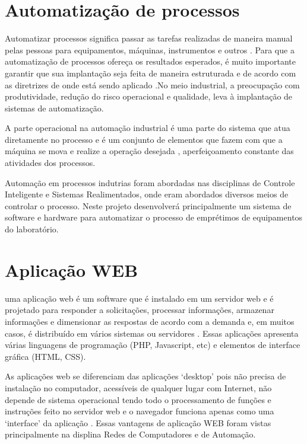\vspace{-42pt}
\section[Automatização de processos]{Automatização de processos}
Automatizar processos significa passar as tarefas realizadas de maneira manual pelas pessoas para equipamentos, máquinas, instrumentos e outros \cite{AutomatProcess}. Para que a automatização de processos ofereça os resultados esperados, é muito importante garantir que sua implantação seja feita de maneira estruturada e de acordo com as diretrizes de onde está sendo aplicado \cite{AutomatProcess2}.No meio industrial, a preocupação com produtividade, redução do risco operacional e qualidade, leva à implantação de sistemas de automatização. 

A parte operacional na automação industrial é uma parte do sistema que atua diretamente no processo e é um conjunto de elementos que fazem com que a máquina se mova e realize a operação desejada \cite{AutomatProcess3}, aperfeiçoamento constante das atividades dos processos.

Automação em processos indutrias foram abordadas nas disciplinas de Controle Inteligente e Sistemas Realimentados, onde eram abordados diversos meios de controlar o processo. Neste projeto desenvolverá principalmente um sistema de software e hardware para automatizar o processo de emprétimos de equipamentos do laboratório.

\section[Aplicação WEB]{Aplicação WEB}
uma aplicação web é um software que é instalado em um servidor web e é projetado para responder a solicitações, processar informações, armazenar informações e dimensionar as respostas de acordo com a demanda e, em muitos casos, é distribuído em vários sistemas ou servidores \cite{WEB1}. Essas aplicações apresenta várias linguagens de programação (PHP, Javascript, etc) e elementos de interface gráfica (HTML, CSS).

As aplicações web se diferenciam das aplicações ‘desktop’ pois não precisa de instalação no computador, acessíveis de qualquer lugar com Internet, não depende de sistema operacional tendo todo o processamento de funções e instruções feito no servidor web e o navegador funciona apenas como uma ‘interface’ da  aplicação \cite{WEB2}. Essas vantagens de aplicação WEB foram vistas principalmente na displina  Redes de Computadores e de Automação.

